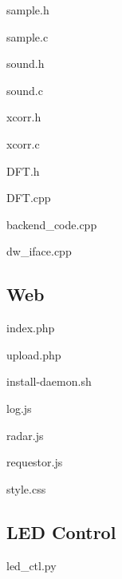 \documentclass[a4paper]{article}
\begin{document}
sample.h


sample.c


sound.h


sound.c


xcorr.h


xcorr.c


DFT.h


DFT.cpp


backend\_code.cpp


dw\_iface.cpp


\subsection{Web}
index.php


upload.php


install-daemon.sh


log.js


radar.js


requestor.js


style.css


\subsection{LED Control}
led\_ctl.py

\end{document}
